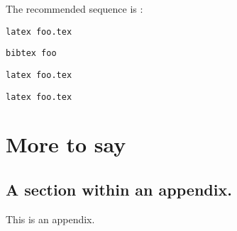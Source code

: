 \documentclass[12pt]{report}
\begin{document}
	The recommended sequence is :
	
	\texttt{latex foo.tex}
	
	\texttt{bibtex foo}
	
	\texttt{latex foo.tex}
	
	\texttt{latex foo.tex}
	
	
	\appendix
	
	\chapter{More to say}
	
	\section{A section within an appendix.}
	This is an appendix.
	
	
	
	
	\singlespacing
	
	
	
	
	
	
	
	
	
\end{document}
